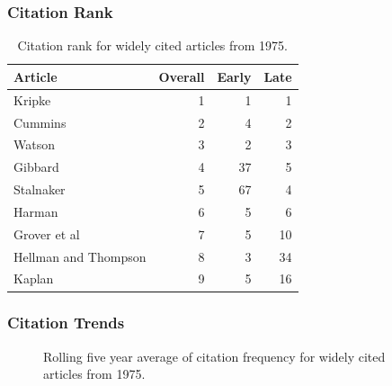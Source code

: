 \documentclass[
  10pt,
  letterpaper,
  DIV=11,
  numbers=noendperiod,
  twoside]{scrartcl}
\begin{document}
\subsubsection*{Citation Rank}\label{sec-rank-1975}

\begin{longtable}[]{@{}lrrr@{}}

\caption{\label{tbl-citation-rank-1975}Citation rank for widely cited
articles from 1975.}

\tabularnewline

\toprule\noalign{}
Article & Overall & Early & Late \\
\midrule\noalign{}
\endhead
\bottomrule\noalign{}
\endlastfoot
Kripke & 1 & 1 & 1 \\
Cummins & 2 & 4 & 2 \\
Watson & 3 & 2 & 3 \\
Gibbard & 4 & 37 & 5 \\
Stalnaker & 5 & 67 & 4 \\
Harman & 6 & 5 & 6 \\
Grover et al & 7 & 5 & 10 \\
Hellman and Thompson & 8 & 3 & 34 \\
Kaplan & 9 & 5 & 16 \\

\end{longtable}

\subsubsection*{Citation Trends}\label{sec-trends-1975}

\begin{figure}


\caption{\label{fig-citation-spaghetti-1975}Rolling five year average of
citation frequency for widely cited articles from 1975.}

\end{figure}%
\end{document}
